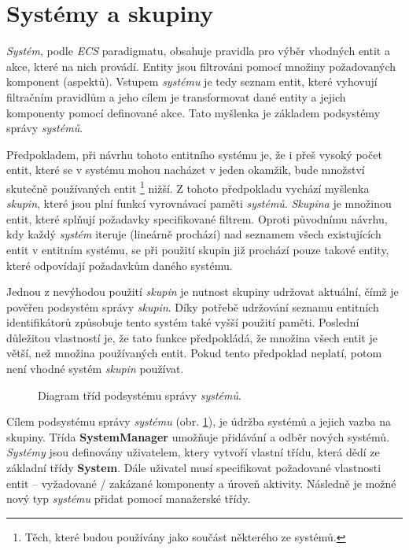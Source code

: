 \section{Systémy a skupiny}
\label{Chap:SysGroup}

\emph{Systém}, podle \emph{ECS} paradigmatu, obsahuje pravidla pro výběr vhodných entit a akce, které na nich provádí. Entity jsou filtrováni pomocí množiny požadovaných komponent (aspektů). Vstupem \emph{systému} je tedy seznam entit, které vyhovují filtračním pravidlům a jeho cílem je transformovat dané entity a jejich komponenty pomocí definované akce. Tato myšlenka je základem podsystémy správy \emph{systémů}. 

Předpokladem, při návrhu tohoto entitního systému je, že i přeš vysoký počet entit, které se v systému mohou nacházet v jeden okamžik, bude množství skutečně používaných entit \footnote{Těch, které budou používány jako součást některého ze systémů.} nižší. Z tohoto předpokladu vychází myšlenka \emph{skupin}, které jsou plní funkcí vyrovnávací paměti \emph{systémů}. \emph{Skupina} je množinou entit, které splňují požadavky specifikované filtrem. Oproti původnímu návrhu, kdy každý \emph{systém} iteruje (lineárně prochází) nad seznamem všech existujících entit v entitním systému, se při použití skupin již prochází pouze takové entity, které odpovídají požadavkům daného systému.

Jednou z nevýhodou použití \emph{skupin} je nutnost skupiny udržovat aktuální, čímž je pověřen podsystém správy \emph{skupin}. Díky potřebě udržování seznamu entitních identifikátorů způsobuje tento systém také vyšší použití paměti. Poslední důležitou vlastností je, že tato funkce předpokládá, že množina všech entit je větší, než množina používaných entit. Pokud tento předpoklad neplatí, potom není vhodné systém \emph{skupin} používat.

\begin{figure}[H]
	\centering
	\caption{Diagram tříd podsystému správy \emph{systémů}.}
	\label{Fig:DESSystemDiagram}
\end{figure}

Cílem podsystému správy \emph{systému} (obr. \ref{Fig:DESSystemDiagram}), je údržba systémů a jejich vazba na skupiny. Třída \textbf{SystemManager} umožňuje přidávání a odběr nových systémů. \emph{Systémy} jsou definovány uživatelem, ktery vytvoří vlastní třídu, která dědí ze základní třídy \textbf{System}. Dále uživatel musí specifikovat požadované vlastnosti entit -- vyžadované / zakázané komponenty a úroveň aktivity. Následně je možné nový typ \emph{systému} přidat pomocí manažerské třídy. 

